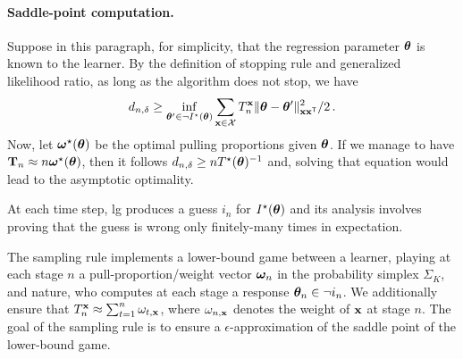 \paragraph{Saddle-point computation.}
Suppose in this paragraph, for simplicity, that the regression parameter ${\boldsymbol \theta}$ is known to the learner. By the definition of stopping rule and generalized likelihood ratio, as long as the algorithm does not stop, we have
\begin{align*}
    d_{n,\delta} \ge \inf_{{\boldsymbol \theta}'\in \neg I^\star({\boldsymbol \theta})} \sum_{{\bf x}\in \mathcal{X}} T_n^{\bf x} \Vert {\boldsymbol \theta} - {\boldsymbol \theta}' \Vert^2_{{\bf x}{\bf x}^\mathsf{\scriptscriptstyle T}}/2\,.
\end{align*}
Now, let ${\boldsymbol \omega}^\star({\boldsymbol \theta})$ be the optimal pulling proportions given ${\boldsymbol \theta}$. If we manage to have ${\bf T}_n \approx n{\boldsymbol \omega}^\star({\boldsymbol \theta})$, then it follows $d_{n,\delta} \ge n T^\star({\boldsymbol \theta})^{-1}$ and, solving that equation would lead to the asymptotic optimality.


At each time step, \gls{lg} produces a guess $i_n$ for $I^\star({\boldsymbol \theta})$ and its analysis involves proving that the guess is wrong only finitely-many times in expectation.

The sampling rule implements a lower-bound game between a learner, playing at each stage $n$ a pull-proportion/weight vector ${\boldsymbol \omega}_n$ in the probability simplex $\Sigma_K$, and nature, who computes at each stage a response ${\boldsymbol \theta}_n \in \neg i_n$. We additionally ensure that $T_n^{\bf x} \approx \sum_{t=1}^n \omega_{t,{\bf x}}$, where $\omega_{n,{\bf x}}$ denotes the weight of ${\bf x}$ at stage $n$. The goal of the sampling rule is to ensure a $\epsilon$-approximation of the saddle point of the lower-bound game.

